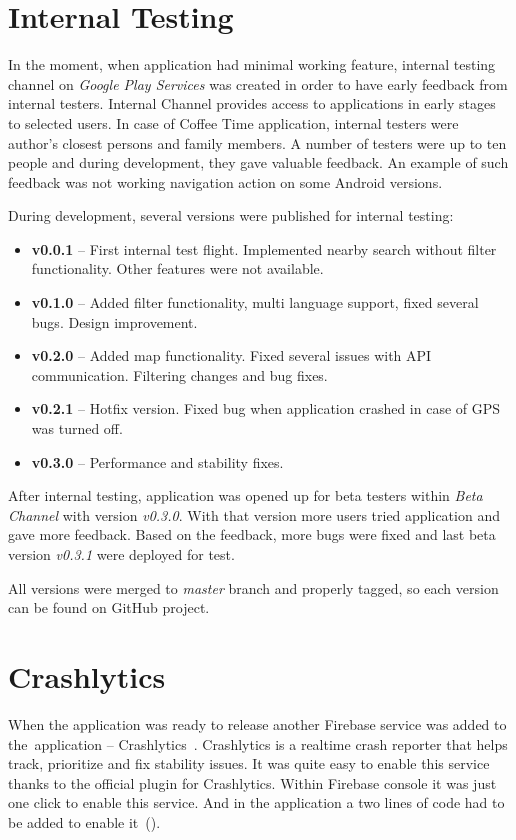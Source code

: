 \section{Internal Testing}
In the moment, when application had minimal working feature, internal testing channel on \textit{Google Play Services} was created in order to have early feedback from internal testers. Internal Channel provides access to applications in early stages to selected users. In case of Coffee Time application, internal testers were author's closest persons and family members. A number of testers were up to ten people and during development, they gave valuable feedback. An example of such feedback was not working navigation action on some Android versions. 

During development, several versions were published for internal testing:

\begin{itemize}
    \item \textbf{v0.0.1} -- First internal test flight. Implemented nearby search without filter functionality. Other features were not available. 
    \item \textbf{v0.1.0} -- Added filter functionality, multi language support, fixed several bugs. Design improvement. 
    \item \textbf{v0.2.0} -- Added map functionality. Fixed several issues with API communication. Filtering changes and bug fixes.
    \item \textbf{v0.2.1} -- Hotfix version. Fixed bug when application crashed in case of GPS was turned off. 
    \item \textbf{v0.3.0} -- Performance and stability fixes. 
\end{itemize}

After internal testing, application was opened up for beta testers within \textit{Beta Channel} with version \textit{v0.3.0}. With that version more users tried application and gave more feedback. Based on the feedback, more bugs were fixed and last beta version \textit{v0.3.1} were deployed for test. 

All versions were merged to \textit{master} branch and properly tagged, so each version can be found on GitHub project. 

\section{Crashlytics}
When the application was ready to release another Firebase service was added to the~application -- Crashlytics~\cite{firebase-crashlytics}. Crashlytics is a realtime crash reporter that helps track, prioritize and fix stability issues. It was quite easy to enable this service thanks to the official plugin for Crashlytics. Within Firebase console it was just one click to enable this service. And in the application a two lines of code had to be added to enable it~().

